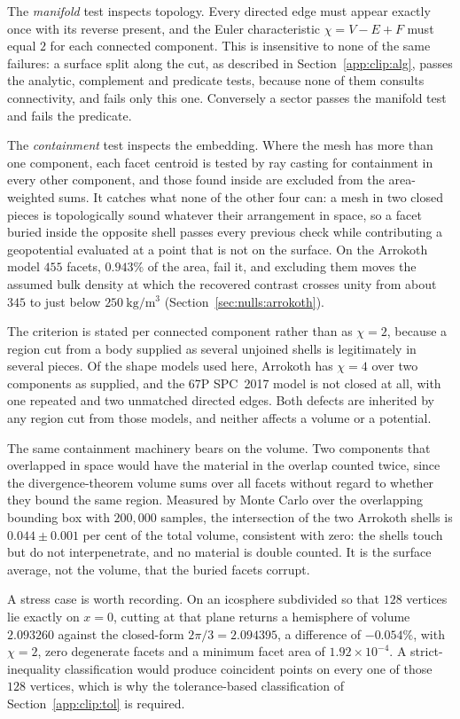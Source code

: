 The \emph{manifold} test inspects topology. Every directed edge must appear
exactly once with its reverse present, and the Euler characteristic
$\chi = V - E + F$ must equal $2$ for each connected component. This is
insensitive to none of the same failures: a surface split along the cut, as
described in Section~\ref{app:clip:alg}, passes the analytic, complement and
predicate tests, because none of them consults connectivity, and fails only
this one. Conversely a sector passes the manifold test and fails the predicate.

The \emph{containment} test inspects the embedding. Where the mesh has more
than one component, each facet centroid is tested by ray casting for
containment in every other component, and those found inside are excluded from
the area-weighted sums. It catches what none of the other four can: a mesh in
two closed pieces is topologically sound whatever their arrangement in space,
so a facet buried inside the opposite shell passes every previous check while
contributing a geopotential evaluated at a point that is not on the surface.
On the Arrokoth model $455$ facets, $0.943\%$ of the area, fail it, and
excluding them moves the assumed bulk density at which the recovered contrast
crosses unity from about $345$ to just below
$\SI{250}{\kilo\gram\per\cubic\metre}$
(Section~\ref{sec:nulls:arrokoth}).

The criterion is stated per connected component rather than as $\chi = 2$,
because a region cut from a body supplied as several unjoined shells is
legitimately in several pieces. Of the shape models used here, Arrokoth has
$\chi = 4$ over two components as supplied, and the 67P SPC~2017 model is not
closed at all, with one repeated and two unmatched directed edges. Both defects
are inherited by any region cut from those models, and neither affects a volume
or a potential.

The same containment machinery bears on the volume. Two components that
overlapped in space would have the material in the overlap counted twice,
since the divergence-theorem volume sums over all facets without regard to
whether they bound the same region. Measured by Monte Carlo over the
overlapping bounding box with $200{,}000$ samples, the intersection of the two
Arrokoth shells is $0.044 \pm 0.001$ per cent of the total volume, consistent
with zero: the shells touch but do not interpenetrate, and no material is
double counted. It is the surface average, not the volume, that the buried
facets corrupt.

A stress case is worth recording. On an icosphere subdivided so that $128$
vertices lie exactly on $x = 0$, cutting at that plane returns a hemisphere of
volume $2.093260$ against the closed-form $2\pi/3 = 2.094395$, a difference of
$-0.054\%$, with $\chi = 2$, zero degenerate facets and a minimum facet area of
$1.92\times10^{-4}$. A strict-inequality classification would produce
coincident points on every one of those $128$ vertices, which is why the
tolerance-based classification of Section~\ref{app:clip:tol} is required.

